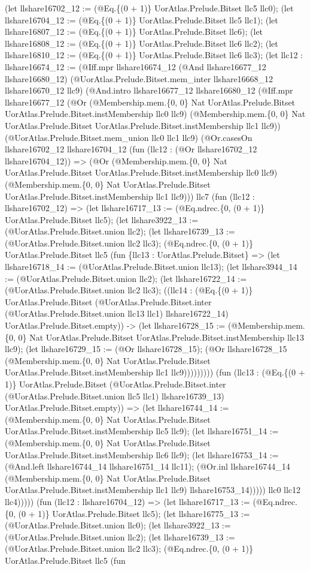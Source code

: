 \documentclass[11pt]{article}
\begin{document}
(let llshare16702\_12 := (@Eq.\{(0 + 1)\} UorAtlas.Prelude.Bitset llc5 llc0); (let llshare16704\_12 := (@Eq.\{(0 + 1)\} UorAtlas.Prelude.Bitset llc5 llc1); (let llshare16807\_12 := (@Eq.\{(0 + 1)\} UorAtlas.Prelude.Bitset llc6); (let llshare16808\_12 := (@Eq.\{(0 + 1)\} UorAtlas.Prelude.Bitset llc6 llc2); (let llshare16810\_12 := (@Eq.\{(0 + 1)\} UorAtlas.Prelude.Bitset llc6 llc3); (let llc12 : llshare16674\_12 := (@Iff.mpr llshare16674\_12 (@And llshare16677\_12 llshare16680\_12) (@UorAtlas.Prelude.Bitset.mem\_inter llshare16668\_12 llshare16670\_12 llc9) (@And.intro llshare16677\_12 llshare16680\_12 (@Iff.mpr llshare16677\_12 (@Or (@Membership.mem.\{0, 0\} Nat UorAtlas.Prelude.Bitset UorAtlas.Prelude.Bitset.instMembership llc0 llc9) (@Membership.mem.\{0, 0\} Nat UorAtlas.Prelude.Bitset UorAtlas.Prelude.Bitset.instMembership llc1 llc9)) (@UorAtlas.Prelude.Bitset.mem\_union llc0 llc1 llc9) (@Or.casesOn llshare16702\_12 llshare16704\_12 (fun (llc12 : (@Or llshare16702\_12 llshare16704\_12)) => (@Or (@Membership.mem.\{0, 0\} Nat UorAtlas.Prelude.Bitset UorAtlas.Prelude.Bitset.instMembership llc0 llc9) (@Membership.mem.\{0, 0\} Nat UorAtlas.Prelude.Bitset UorAtlas.Prelude.Bitset.instMembership llc1 llc9))) llc7 (fun (llc12 : llshare16702\_12) => (let llshare16717\_13 := (@Eq.ndrec.\{0, (0 + 1)\} UorAtlas.Prelude.Bitset llc5); (let llshare3922\_13 := (@UorAtlas.Prelude.Bitset.union llc2); (let llshare16739\_13 := (@UorAtlas.Prelude.Bitset.union llc2 llc3); (@Eq.ndrec.\{0, (0 + 1)\} UorAtlas.Prelude.Bitset llc5 (fun \{llc13 : UorAtlas.Prelude.Bitset\} => (let llshare16718\_14 := (@UorAtlas.Prelude.Bitset.union llc13); (let llshare3944\_14 := (@UorAtlas.Prelude.Bitset.union llc2); (let llshare16722\_14 := (@UorAtlas.Prelude.Bitset.union llc2 llc3); ((llc14 : (@Eq.\{(0 + 1)\} UorAtlas.Prelude.Bitset (@UorAtlas.Prelude.Bitset.inter (@UorAtlas.Prelude.Bitset.union llc13 llc1) llshare16722\_14) UorAtlas.Prelude.Bitset.empty)) -> (let llshare16728\_15 := (@Membership.mem.\{0, 0\} Nat UorAtlas.Prelude.Bitset UorAtlas.Prelude.Bitset.instMembership llc13 llc9); (let llshare16729\_15 := (@Or llshare16728\_15); (@Or llshare16728\_15 (@Membership.mem.\{0, 0\} Nat UorAtlas.Prelude.Bitset UorAtlas.Prelude.Bitset.instMembership llc1 llc9))))))))) (fun (llc13 : (@Eq.\{(0 + 1)\} UorAtlas.Prelude.Bitset (@UorAtlas.Prelude.Bitset.inter (@UorAtlas.Prelude.Bitset.union llc5 llc1) llshare16739\_13) UorAtlas.Prelude.Bitset.empty)) => (let llshare16744\_14 := (@Membership.mem.\{0, 0\} Nat UorAtlas.Prelude.Bitset UorAtlas.Prelude.Bitset.instMembership llc5 llc9); (let llshare16751\_14 := (@Membership.mem.\{0, 0\} Nat UorAtlas.Prelude.Bitset UorAtlas.Prelude.Bitset.instMembership llc6 llc9); (let llshare16753\_14 := (@And.left llshare16744\_14 llshare16751\_14 llc11); (@Or.inl llshare16744\_14 (@Membership.mem.\{0, 0\} Nat UorAtlas.Prelude.Bitset UorAtlas.Prelude.Bitset.instMembership llc1 llc9) llshare16753\_14))))) llc0 llc12 llc4))))) (fun (llc12 : llshare16704\_12) => (let llshare16717\_13 := (@Eq.ndrec.\{0, (0 + 1)\} UorAtlas.Prelude.Bitset llc5); (let llshare16775\_13 := (@UorAtlas.Prelude.Bitset.union llc0); (let llshare3922\_13 := (@UorAtlas.Prelude.Bitset.union llc2); (let llshare16739\_13 := (@UorAtlas.Prelude.Bitset.union llc2 llc3); (@Eq.ndrec.\{0, (0 + 1)\} UorAtlas.Prelude.Bitset llc5 (fun 
\end{document}
